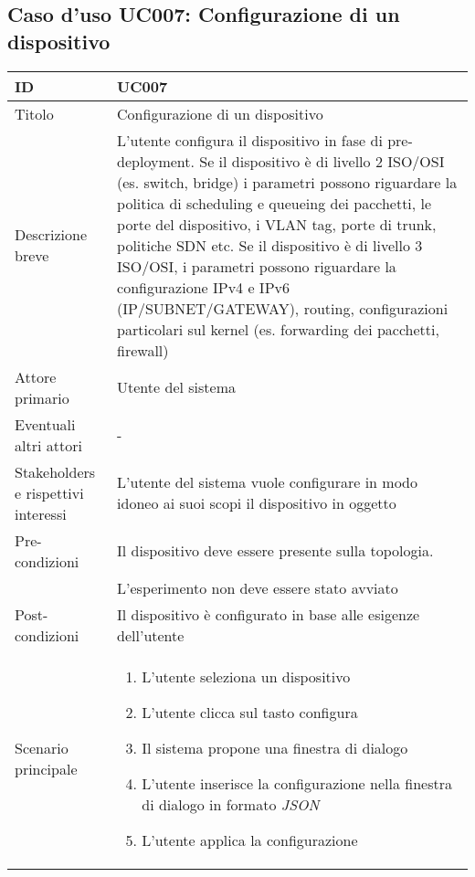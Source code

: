 \documentclass[../../main.tex]{subfiles}
\begin{document}
\subsection{Caso d’uso UC007: Configurazione di un dispositivo  }
\begin{tabularx}{150mm}{|l|X|}
    \hline
    ID                                  & \textbf{UC007}\\
    \hline
    Titolo                              & Configurazione di un dispositivo \\
    \hline
    Descrizione breve                   & L'utente configura il dispositivo in fase di pre-deployment. Se il dispositivo è di livello 2 ISO/OSI (es. switch, bridge) i parametri possono riguardare la politica di scheduling e queueing dei pacchetti, le porte del dispositivo, i VLAN tag, porte di trunk, politiche SDN etc.   
    Se il dispositivo è di livello 3 ISO/OSI, i parametri possono riguardare la configurazione IPv4 e IPv6 (IP/SUBNET/GATEWAY), routing, configurazioni particolari sul kernel (es. forwarding dei pacchetti, firewall) \\
    \hline
    Attore primario                     & Utente del sistema   \\
    \hline
    Eventuali altri attori              & -   \\
    \hline
    Stakeholders e rispettivi interessi & L'utente del sistema vuole configurare in modo idoneo ai suoi scopi il dispositivo in oggetto   \\
    \hline
    Pre-condizioni                      & Il dispositivo deve essere presente sulla topologia.\\& L'esperimento non deve essere stato avviato    \\
    \hline
    Post-condizioni                     & Il dispositivo è configurato in base alle esigenze dell'utente   \\
    \hline
    Scenario principale                 &
    \begin{enumerate}
        \item L'utente seleziona un dispositivo
        \item L'utente clicca sul tasto configura
        \item Il sistema propone una finestra di dialogo
        \item L'utente inserisce la configurazione nella finestra di dialogo in formato \textit{JSON}
        \item L'utente applica la configurazione
    \end{enumerate}

\end{tabularx}
\end{document}
